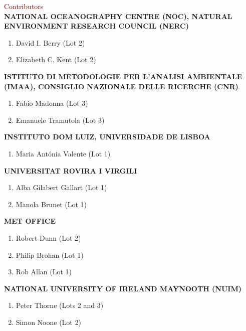 \documentclass[a4paper,12pt]{article}
\begin{document}
\begin{adjustwidth}{2.cm}{}
\vspace* {10mm}

{\fontsize{20}{24} \selectfont \textcolor{maroon}{Contributors}}\\

{\fontsize{14}{17} \selectfont \textbf{\uppercase{{National Oceanography Centre (NOC), Natural Environment Research Council (NERC)}}}}
\begin{enumerate}
\item David I. Berry (Lot 2)
\item Elizabeth C. Kent (Lot 2)\\
\end{enumerate}


{\fontsize{14}{17} \selectfont \textbf{\uppercase{Istituto di Metodologie per l'Analisi Ambientale (IMAA), Consiglio Nazionale delle Ricerche (CNR)}}}
\begin{enumerate}
\item Fabio Madonna (Lot 3)
\item Emanuele Tramutola (Lot 3)
\end{enumerate}

{\fontsize{14}{17} \selectfont \textbf{\uppercase{Instituto Dom Luiz, Universidade de Lisboa}}}
\begin{enumerate}
\item Maria Ant\'onia Valente (Lot 1)\\
\end{enumerate}

{\fontsize{14}{17} \selectfont \textbf{\uppercase{Universitat Rovira i Virgili }}}
\begin{enumerate}
\item Alba Gilabert Gallart (Lot 1)
\item Manola Brunet (Lot 1)\\
\end{enumerate}

{\fontsize{14}{17} \selectfont \textbf{\uppercase{Met Office}}}
\begin{enumerate}
\item Robert Dunn (Lot 2)
\item Philip Brohan (Lot 1)
\item Rob Allan (Lot 1)\\
\end{enumerate}

{\fontsize{14}{17} \selectfont \textbf{\uppercase{National University of Ireland Maynooth (NUIM)}}}
\begin{enumerate}
\item Peter Thorne (Lots 2 and 3)
\item Simon Noone (Lot 2)\\
\end{enumerate}


\end{adjustwidth}
\end{document}
